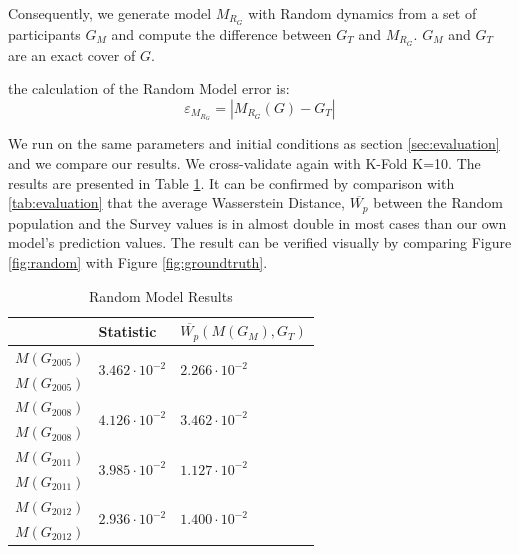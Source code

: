 {Consequently, we generate model $M_{R_G}$ with Random dynamics from a set of participants $G_M$ and compute the difference between $G_T$ and $M_{R_G}$. $G_M$ and $G_T$ are an exact cover of $G$.

the calculation of the Random Model error is:
\[\varepsilon_{M_{R_G}}= | M_{R_G}(G)-G_T |\] 

We run on the same parameters and initial conditions as section \ref{sec:evaluation} and we compare our results. We cross-validate again with K-Fold K=10. The results are presented in Table \ref{tab:random}. It can be confirmed by comparison with \ref{tab:evaluation} that the average  Wasserstein Distance, $\overline{W_p}$  between the Random population and the Survey values is in almost double in most cases than our own model's prediction values. The result can be verified visually by comparing Figure \ref{fig:random} with Figure \ref{fig:groundtruth}.

\begin{table}[!th]
	
	\caption{Random Model Results}
	\begin{tabular}{|l|l|l|}
		\hline
		& Statistic & $\overline{W_p}(M(G_{M}),G_{{T}})$\\
		
		\hline			
		$M(G_{2005})$    &      \multirow{2}{*}{ $3.462\cdot10^{-2}$ } & \multirow{2}{*}{$2.266\cdot10^{-2}$}            \\ 
		
		$M(G_{2005})$            & &   \\     
		\hline
		$M(G_{2008})$             &      \multirow{2}{*}{ $4.126\cdot10^{-2}$ }  &  \multirow{2}{*}{$3.462\cdot10^{-2}$}         \\ 
		
		$M(G_{2008})$                &   & \\     
		\hline
		$M(G_{2011})$           &      \multirow{2}{*}{ $3.985\cdot10^{-2}$ }    & \multirow{2}{*}{$1.127\cdot10^{-2}$}          \\ 
		
		$M(G_{2011})$            &    &\\     
		\hline	
		
		$M(G_{2012})$              &      \multirow{2}{*}{ $2.936\cdot10^{-2}$ }    &     \multirow{2}{*}{$1.400\cdot10^{-2}$}       \\ 
		
		$M(G_{2012})$           &   & \\     
		\hline						
	\end{tabular}
	\label{tab:random}
\end{table}

}
